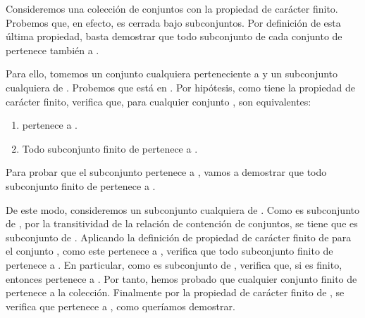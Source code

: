 \begin{isabellebody}
\begin{isamarkuptext}
  \begin{demostracion}
    Consideremos una colección de conjuntos  con la propiedad de carácter finito. Probemos que, 
    en efecto, es cerrada bajo subconjuntos. Por definición de esta última propiedad, basta 
    demostrar que todo subconjunto de cada conjunto de  pertenece también a .

    Para ello, tomemos un conjunto  cualquiera perteneciente a  y un subconjunto cualquiera 
     de . Probemos que  está en . Por hipótesis, como  tiene la propiedad de carácter 
    finito, verifica que, para cualquier conjunto , son equivalentes:
    \begin{enumerate}
      \item {} pertenece a .
      \item Todo subconjunto finito de  pertenece a .
    \end{enumerate}

    Para probar que el subconjunto  pertenece a , vamos a demostrar que todo subconjunto 
    finito de  pertenece a .

    De este modo, consideremos un subconjunto cualquiera  de . Como  es subconjunto de , 
    por la transitividad de la relación de contención de conjuntos, se tiene que  es subconjunto 
    de . Aplicando la definición de propiedad de carácter finito de  para el conjunto , 
    como este pertenece a , verifica que todo subconjunto finito de  pertenece a . En
    particular, como  es subconjunto de , verifica que, si  es finito, entonces  
    pertenece a . Por tanto, hemos probado que cualquier conjunto finito de  pertenece a la
    colección. Finalmente por la propiedad de carácter finito de , se verifica que  pertenece 
    a , como queríamos demostrar.
  \end{demostracion}


\end{isamarkuptext}
\end{isabellebody}
